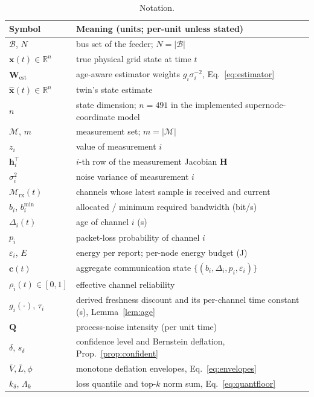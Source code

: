 \documentclass[journal]{IEEEtran}
\theoremstyle{plain}
\theoremstyle{definition}
\theoremstyle{remark}
\newcommand{\bx}{\mathbf{x}}
\newcommand{\bxh}{\hat{\mathbf{x}}}
\newcommand{\bh}{\mathbf{h}}
\newcommand{\bH}{\mathbf{H}}
\newcommand{\bW}{\mathbf{W}}
\newcommand{\bc}{\mathbf{c}}
\newcommand{\Mrx}{\mathcal{M}_{\mathrm{rx}}}
\newcommand{\bQ}{\mathbf{Q}}
\begin{document}
\begin{table}[!t]
\caption{Notation.}
\label{tab:notation}
\centering
\footnotesize
\renewcommand{\arraystretch}{1.15}
\begin{tabular}{@{}l p{5.6cm}@{}}
\toprule
Symbol & Meaning (units; per-unit unless stated) \\
\midrule
$\mathcal{B}$, $N$ & bus set of the feeder; $N=|\mathcal{B}|$ \\
$\bx(t)\in\mathbb{R}^{n}$ & true physical grid state at time $t$ \\
$\bW_{\!\mathrm{est}}$ & age-aware estimator weights $g_i\sigma_i^{-2}$, Eq.~\eqref{eq:estimator} \\
$\bxh(t)\in\mathbb{R}^{n}$ & twin's state estimate \\
$n$ & state dimension; $n=491$ in the implemented supernode-coordinate model \\
$\mathcal{M}$, $m$ & measurement set; $m=|\mathcal{M}|$ \\
$z_i$ & value of measurement $i$ \\
$\bh_i^{\top}$ & $i$-th row of the measurement Jacobian $\bH$ \\
$\sigma_i^{2}$ & noise variance of measurement $i$ \\
$\Mrx(t)$ & channels whose latest sample is received and current \\
$b_i$, $b_i^{\min}$ & allocated / minimum required bandwidth (bit/s) \\
$\Delta_i(t)$ & age of channel $i$ (s) \\
$p_i$ & packet-loss probability of channel $i$ \\
$\varepsilon_i$, $E$ & energy per report; per-node energy budget (J) \\
$\bc(t)$ & aggregate communication state $\{(b_i,\Delta_i,p_i,\varepsilon_i)\}$ \\
$\rho_i(t)\in[0,1]$ & effective channel reliability \\
$g_i(\cdot)$, $\tau_i$ & derived freshness discount and its per-channel
time constant (s), Lemma~\ref{lem:age} \\
$\bQ$ & process-noise intensity (per unit time) \\
$\delta$, $s_\delta$ & confidence level and Bernstein deflation, Prop.~\ref{prop:confident} \\
$\bar V,\bar L,\phi$ & monotone deflation envelopes, Eq.~\eqref{eq:envelopes} \\
$k_\delta$, $\Lambda_k$ & loss quantile and top-$k$ norm sum, Eq.~\eqref{eq:quantfloor} \\

\end{tabular}
\end{table}
\end{document}
